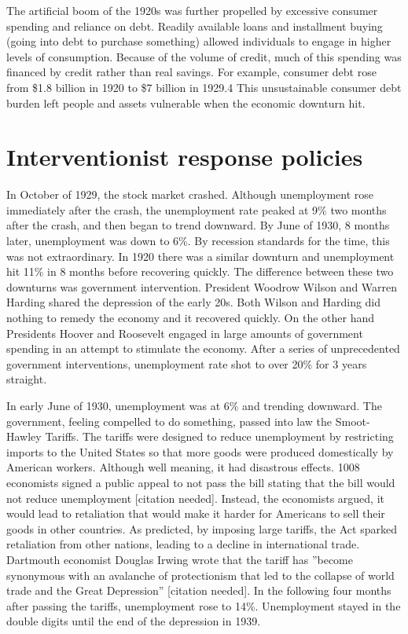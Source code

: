 \documentclass{article}
\begin{document}
The artificial boom of the 1920s was further propelled by excessive consumer
spending and reliance on debt. Readily available loans and installment buying
(going into debt to purchase something) allowed individuals to engage in higher
levels of consumption. Because of the volume of credit, much of this spending
was financed by credit rather than real savings. For example, consumer debt
rose from \$1.8 billion in 1920 to \$7 billion in 1929.4 This unsustainable
consumer debt burden left people and assets vulnerable when the economic
downturn hit.

\section{Interventionist response policies}

In October of 1929, the stock market crashed. Although unemployment rose
immediately after the crash, the unemployment rate peaked at 9\% two months
after the crash, and then began to trend downward. By June of 1930, 8 months
later, unemployment was down to 6\%. By recession standards for the time, this
was not extraordinary. In 1920 there was a similar downturn and unemployment
hit 11\% in 8 months before recovering quickly. The difference between these
two downturns was government intervention. President Woodrow Wilson and
Warren Harding shared the depression of the early 20s. Both Wilson and Harding
did nothing to remedy the economy and it recovered quickly. On the other hand
Presidents Hoover and Roosevelt engaged in large amounts of government spending
in an attempt to stimulate the economy. After a series of unprecedented
government interventions, unemployment rate shot to over 20\% for 3 years
straight.

In early June of 1930, unemployment was at 6\% and trending downward. The
government, feeling compelled to do something, passed into law the Smoot-Hawley
Tariffs. The tariffs were designed to reduce unemployment by restricting
imports to the United States so that more goods were produced domestically by
American workers. Although well meaning, it had disastrous effects. 1008
economists signed a public appeal to not pass the bill stating that the bill
would not reduce unemployment [citation needed]. Instead, the economists
argued, it would lead to retaliation that would make it harder for Americans to
sell their goods in other countries. As predicted, by imposing large tariffs,
the Act sparked retaliation from other nations, leading to a decline in
international trade. Dartmouth economist Douglas Irwing wrote that the tariff
has ”become synonymous with an avalanche of protectionism that led to the
collapse of world trade and the Great Depression” [citation needed]. In the
following four months after passing the tariffs, unemployment rose to 14\%.
Unemployment stayed in the double digits until the end of the depression in
1939.
\end{document}
